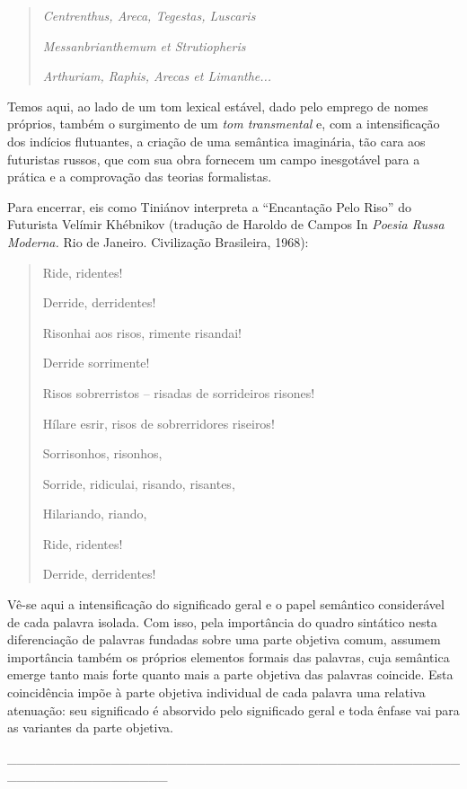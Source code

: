 \begin{quote}
\emph{Centrenthus, Areca, Tegestas, Luscaris}

\emph{Messanbrianthemum et Strutiopheris}

\emph{Arthuriam, Raphis, Arecas et Limanthe...}
\end{quote}

Temos aqui, ao lado de um tom lexical estável, dado pelo emprego de
nomes próprios, também o surgimento de um \emph{tom transmental} e, com
a intensificação dos indícios flutuantes, a criação de uma semântica
imaginária, tão cara aos futuristas russos, que com sua obra fornecem um
campo inesgotável para a prática e a comprovação das teorias
formalistas.

Para encerrar, eis como Tiniánov interpreta a ``Encantação Pelo Riso''
do Futurista Velímir Khébnikov (tradução de Haroldo de Campos In
\emph{Poesia Russa Moderna.} Rio de Janeiro. Civilização Brasileira,
1968):

\begin{quote}
Ride, ridentes!

Derride, derridentes!

Risonhai aos risos, rimente risandai!

Derride sorrimente!

Risos sobrerristos -- risadas de sorrideiros risones!

Hílare esrir, risos de sobrerridores riseiros!

Sorrisonhos, risonhos,

Sorride, ridiculai, risando, risantes,

Hilariando, riando,

Ride, ridentes!

Derride, derridentes!
\end{quote}

Vê-se aqui a intensificação do significado geral e o papel semântico
considerável de cada palavra isolada. Com isso, pela importância do
quadro sintático nesta diferenciação de palavras fundadas sobre uma
parte objetiva comum, assumem importância também os próprios elementos
formais das palavras, cuja semântica emerge tanto mais forte quanto mais
a parte objetiva das palavras coincide. Esta coincidência impõe à parte
objetiva individual de cada palavra uma relativa atenuação: seu
significado é absorvido pelo significado geral e toda ênfase vai para as
variantes da parte objetiva.

\_\_\_\_\_\_\_\_\_\_\_\_\_\_\_\_\_\_\_\_\_\_\_\_\_\_\_\_\_\_\_\_\_\_\_\_\_\_\_\_\_\_\_\_\_\_\_\_\_\_\_\_\_\_\_\_\_\_\_\_\_\_\_\_\_

